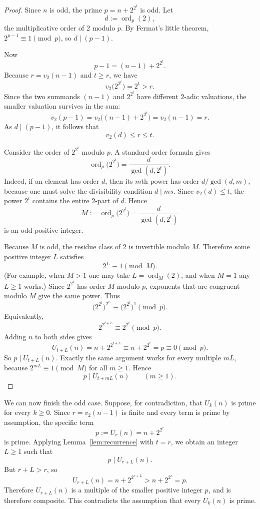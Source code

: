 \documentclass[11pt]{article}
\theoremstyle{remark}
\begin{document}
        \begin{proof}
          Since $n$ is odd, the prime $p=n+2^{2^t}$ is odd. Let
          \[
            d:=\operatorname{ord}_p(2),
          \]
          the multiplicative order of $2$ modulo $p$. By Fermat's little theorem, $2^{p-1}\equiv 1\pmod p$, so $d\mid (p-1)$.

          Now
          \[
            p-1=(n-1)+2^{2^t}.
          \]
          Because $r=v_2(n-1)$ and $t\ge r$, we have
          \[
            v_2\bigl(2^{2^t}\bigr)=2^t>r.
          \]
          Since the two summands $(n-1)$ and $2^{2^t}$ have different $2$-adic valuations, the smaller valuation survives in the sum:
          \[
            v_2(p-1)=v_2\bigl((n-1)+2^{2^t}\bigr)=v_2(n-1)=r.
          \]
          As $d\mid (p-1)$, it follows that
          \[
            v_2(d)\le r\le t.
          \]

          Consider the order of $2^{2^t}$ modulo $p$. A standard order formula gives
          \[
            \operatorname{ord}_p\bigl(2^{2^t}\bigr)=\frac{d}{\gcd(d,2^t)}.
          \]
          Indeed, if an element has order $d$, then its $m$th power has order $d/\gcd(d,m)$, because one must solve the divisibility condition $d\mid ms$. Since $v_2(d)\le t$, the power $2^t$ contains the entire $2$-part of $d$. Hence
          \[
            M:=\operatorname{ord}_p\bigl(2^{2^t}\bigr)=\frac{d}{\gcd(d,2^t)}
          \]
          is an odd positive integer.

          Because $M$ is odd, the residue class of $2$ is invertible modulo $M$. Therefore some positive integer $L$ satisfies
          \[
            2^L\equiv 1 \pmod M.
          \]
          (For example, when $M>1$ one may take $L=\operatorname{ord}_M(2)$, and when $M=1$ any $L\ge 1$ works.) Since $2^{2^t}$ has order $M$ modulo $p$, exponents that are congruent modulo $M$ give the same power. Thus
          \[
            \bigl(2^{2^t}\bigr)^{2^L}\equiv \bigl(2^{2^t}\bigr)^1 \pmod p.
          \]
          Equivalently,
          \[
            2^{2^{t+L}}\equiv 2^{2^t} \pmod p.
          \]
          Adding $n$ to both sides gives
          \[
            U_{t+L}(n)=n+2^{2^{t+L}}\equiv n+2^{2^t}=p\equiv 0 \pmod p.
          \]
          So $p\mid U_{t+L}(n)$. Exactly the same argument works for every multiple $mL$, because $2^{mL}\equiv 1\pmod M$ for all $m\ge 1$. Hence
          \[
            p\mid U_{t+mL}(n)\qquad(m\ge 1).
          \]
        \end{proof}

        We can now finish the odd case. Suppose, for contradiction, that $U_k(n)$ is prime for every $k\ge 0$. Since $r=v_2(n-1)$ is finite and every term is prime by assumption, the specific term
        \[
          p:=U_r(n)=n+2^{2^r}
        \]
        is prime. Applying Lemma~\ref{lem:recurrence} with $t=r$, we obtain an integer $L\ge 1$ such that
        \[
          p\mid U_{r+L}(n).
        \]
        But $r+L>r$, so
        \[
          U_{r+L}(n)=n+2^{2^{r+L}}>n+2^{2^r}=p.
        \]
        Therefore $U_{r+L}(n)$ is a multiple of the smaller positive integer $p$, and is therefore composite. This contradicts the assumption that every $U_k(n)$ is prime.
\end{document}
